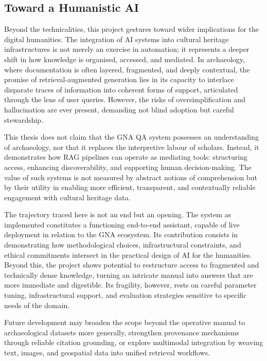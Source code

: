 \begin{spacing}{1.5}
\section{Toward a Humanistic AI}
Beyond the technicalities, this project gestures toward wider implications for the digital humanities. The integration of AI systems into cultural heritage infrastructures is not merely an exercise in automation; it represents a deeper shift in how knowledge is organised, accessed, and mediated. In archaeology, where documentation is often layered, fragmented, and deeply contextual, the promise of retrieval-augmented generation lies in its capacity to interlace disparate traces of information into coherent forms of support, articulated through the lens of user queries. However, the risks of oversimplification and hallucination are ever present, demanding not blind adoption but careful stewardship.

This thesis does not claim that the GNA QA system possesses an understanding of archaeology, nor that it replaces the interpretive labour of scholars. Instead, it demonstrates how RAG pipelines can operate as mediating tools: structuring access, enhancing discoverability, and supporting human decision-making. The value of such systems is not measured by abstract notions of comprehension but by their utility in enabling more efficient, transparent, and contextually reliable engagement with cultural heritage data.

The trajectory traced here is not an end but an opening. The system as implemented constitutes a functioning end-to-end assistant, capable of live deployment in relation to the GNA ecosystem. Its contribution consists in demonstrating how methodological choices, infrastructural constraints, and ethical commitments intersect in the practical design of AI for the humanities. Beyond this, the project shows potential to restructure access to fragmented and technically dense knowledge, turning an intricate manual into answers that are more immediate and digestible. Its fragility, however, rests on careful parameter tuning, infrastructural support, and evaluation strategies sensitive to specific needs of the domain.

Future development may broaden the scope beyond the operative manual to archaeological datasets more generally, strengthen provenance mechanisms through reliable citation grounding, or explore multimodal integration by weaving text, images, and geospatial data into unified retrieval workflows.


\end{spacing}
